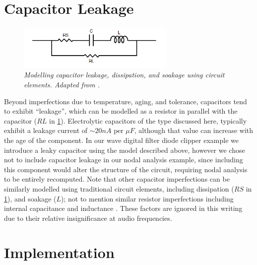 \documentclass[twoside,a4paper]{article}
\begin{document}
\section{Capacitor Leakage} \label{sec:capleak}
%
\begin{figure}[h]
    \center
    \includegraphics[width=3in]{Pics/capleak.png}
    \caption{\label{capleak}{\it Modelling capacitor leakage,
    dissipation, and soakage using circuit elements. Adapted from
    \cite{capleak}.}}
\end{figure}
%
Beyond imperfections due to temperature, aging, and tolerance,
capacitors tend to exhibit ``leakage'', which can be modelled
as a resistor in parallel with the capacitor ($RL$ in \cref{capleak}).
Electrolytic capacitors of the type discussed here, typically exhibit
a leakage current of $\sim 20 nA \text{ per } \mu F$, although that
value can increase with the age of the component. In our wave digital
filter diode clipper example we introduce a leaky capacitor using the
model described above, however we chose not to include capacitor leakage
in our nodal analysis example, since including this component would alter
the structure of the circuit, requiring nodal analysis to be entirely
recomputed.
\newline\newline
Note that other capacitor imperfections can be similarly modelled using
traditional circuit elements, including dissipation ($RS$ in
\cref{capleak}), and soakage ($L$); not to mention similar resistor
imperfections including internal capacitance and inductance \cite{capleak}.
These factors are ignored in this writing due to their relative
insignificance at audio frequencies.

\section{Implementation} \label{sec:impl}
%
\end{document}
